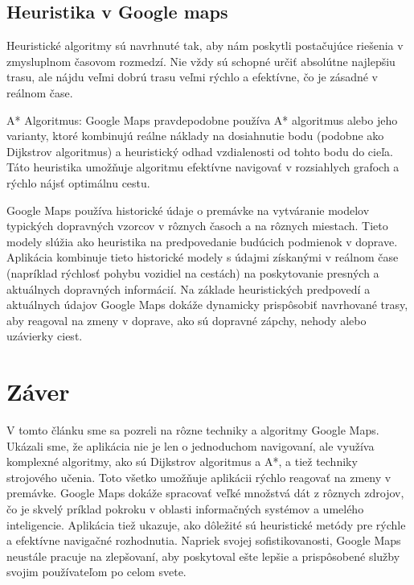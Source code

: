 \documentclass[10pt,slovak,a4paper]{article}
\begin{document}
 \subsection{Heuristika v Google maps}
 Heuristické algoritmy sú navrhnuté tak, aby nám poskytli postačujúce riešenia v zmysluplnom časovom rozmedzí. Nie vždy sú schopné určiť absolútne najlepšiu trasu, ale nájdu veľmi dobrú trasu veľmi rýchlo a efektívne, čo je zásadné v reálnom čase.
\par A* Algoritmus: Google Maps pravdepodobne používa A* algoritmus alebo jeho varianty, ktoré kombinujú reálne náklady na dosiahnutie bodu (podobne ako Dijkstrov algoritmus) a heuristický odhad vzdialenosti od tohto bodu do cieľa. Táto heuristika umožňuje algoritmu efektívne navigovať v rozsiahlych grafoch a rýchlo nájsť optimálnu cestu.
\par Google Maps používa historické údaje o premávke na vytváranie modelov typických dopravných vzorcov v rôznych časoch a na rôznych miestach. Tieto modely slúžia ako heuristika na predpovedanie budúcich podmienok v doprave. Aplikácia kombinuje tieto historické modely s údajmi získanými v reálnom čase (napríklad rýchlosť pohybu vozidiel na cestách) na poskytovanie presných a aktuálnych dopravných informácií. Na základe heuristických predpovedí a aktuálnych údajov Google Maps dokáže dynamicky prispôsobiť navrhované trasy, aby reagoval na zmeny v doprave, ako sú dopravné zápchy, nehody alebo uzávierky ciest.




\section{Záver} \label{zaver} %

V tomto článku sme sa pozreli na rôzne techniky a algoritmy Google Maps. Ukázali sme, že aplikácia nie je len o jednoduchom navigovaní, ale využíva komplexné algoritmy, ako sú Dijkstrov algoritmus a A*, a tiež techniky strojového učenia. Toto všetko umožňuje aplikácii rýchlo reagovať na zmeny v premávke.
Google Maps dokáže spracovať veľké množstvá dát z rôznych zdrojov, čo je skvelý príklad pokroku v oblasti informačných systémov a umelého inteligencie. Aplikácia tiež ukazuje, ako dôležité sú heuristické metódy pre rýchle a efektívne navigačné rozhodnutia. Napriek svojej sofistikovanosti, Google Maps neustále pracuje na zlepšovaní, aby poskytoval ešte lepšie a prispôsobené služby svojim používateľom po celom svete.
\end{document}
